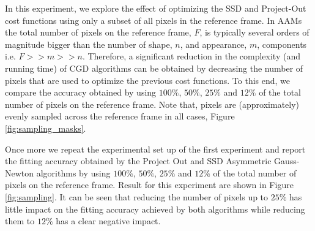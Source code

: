 In this experiment, we explore the effect of optimizing the SSD and Project-Out cost functions using only a subset of all pixels in the reference frame. In AAMs the total number of pixels on the reference frame, $F$, is typically several orders of magnitude bigger than the number of shape, $n$, and appearance, $m$, components i.e. $F>>m>>n$. Therefore, a significant reduction in the complexity (and running time) of CGD algorithms can be obtained by decreasing the number of pixels that are used to optimize the previous cost functions. To this end, we compare the accuracy obtained by using $100\%$, $50\%$, $25\%$ and $12\%$ of the total number of pixels on the reference frame. Note that, pixels are (approximately) evenly sampled across the reference frame in all cases, Figure \ref{fig:sampling_masks}.

Once more we repeat the experimental set up of the first experiment and report the fitting accuracy obtained by the Project Out and SSD Asymmetric Gauss-Newton algorithms by using $100\%$, $50\%$, $25\%$ and $12\%$ of the total number of pixels on the reference frame.
Result for this experiment are shown in Figure \ref{fig:sampling}. It can be seen that reducing the number of pixels up to $25\%$ has little impact on the fitting accuracy achieved by both algorithms while reducing them to $12\%$ has a clear negative impact.

